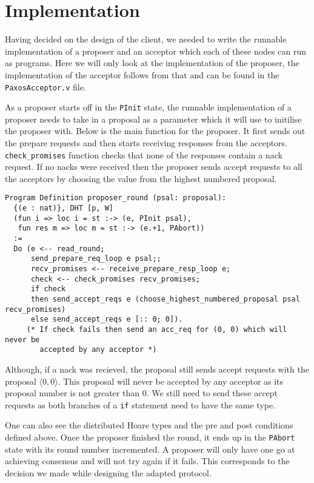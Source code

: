 \section{Implementation}
Having decided on the design of the client, we needed to write the runnable implementation of a
proposer and an acceptor which each of these nodes can run as programs. Here we
will only look at the implementation of the proposer, the implementation of
the acceptor follows from that and can be found in the \texttt{PaxosAcceptor.v} file.

As a proposer starts off in the \texttt{PInit} state, the runnable implementation
of a proposer needs to take in a proposal as a parameter which it will use to
initilise the proposer with. Below is the main function for the proposer.
It first sends out the prepare requests and then starts receiving responses
from the acceptors. \texttt{check\_promises} function checks that none of the
responses contain a nack request. If no nacks were received then the proposer
sends accept requests to all the acceptors by choosing the value from the
highest numbered proposal.

\begin{lstlisting}
Program Definition proposer_round (psal: proposal):
  {(e : nat)}, DHT [p, W]
  (fun i => loc i = st :-> (e, PInit psal),
   fun res m => loc m = st :-> (e.+1, PAbort))
  :=
  Do (e <-- read_round;
      send_prepare_req_loop e psal;;
      recv_promises <-- receive_prepare_resp_loop e;
      check <-- check_promises recv_promises;
      if check
      then send_accept_reqs e (choose_highest_numbered_proposal psal recv_promises)
      else send_accept_reqs e [:: 0; 0]).
     (* If check fails then send an acc_req for (0, 0) which will never be
        accepted by any acceptor *)
\end{lstlisting}

Although, if a nack was recieved, the proposal still sends
accept requests with the proposal $\langle 0, 0 \rangle$. This proposal will
never be accepted by any acceptor as its proposal number is not greater than 0.
We still need to send these accept requests as both branches of a \texttt{if}
statement need to have the same type.

One can also see the distributed Hoare types and the pre and post conditions
defined above. Once the proposer finished the round, it ends up in the \texttt{PAbort}
state with its round number incremented. A proposer will only have one go at achieving
consensus and will not try again if it fails. This corresponds to the decision we
made while designing the adapted protocol.

